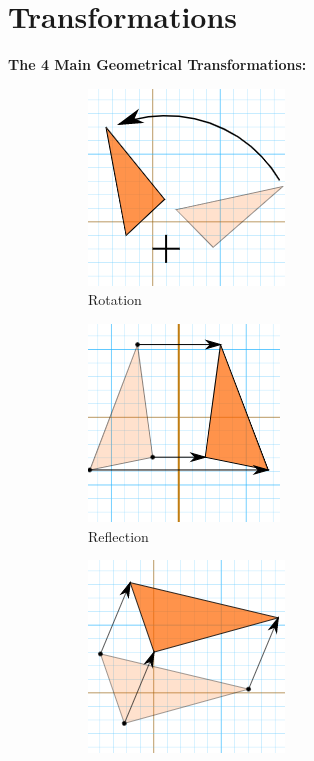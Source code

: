 \documentclass{article}
\begin{document}
    \pagebreak

    \section{Transformations}
        \color{purple} \textbf{The 4 Main Geometrical Transformations:} \color{black} \\

        \begin{figure} [hbt!]
            \centering
            \begin{subfigure}[b]{.45\linewidth}
                \includegraphics[scale=0.5]{Resources/Unit5Transformations/rotation.PNG}
                \caption*{Rotation}
            \end{subfigure}
            \begin{subfigure}[b]{.45\linewidth}
                \includegraphics[scale=0.5]{Resources/Unit5Transformations/reflection.PNG}
                \caption*{Reflection}
            \end{subfigure}
            \begin{subfigure}[b]{.45\linewidth}
                \includegraphics[scale=0.5]{Resources/Unit5Transformations/translation.PNG}

\end{subfigure}
\end{figure}
\end{document}
